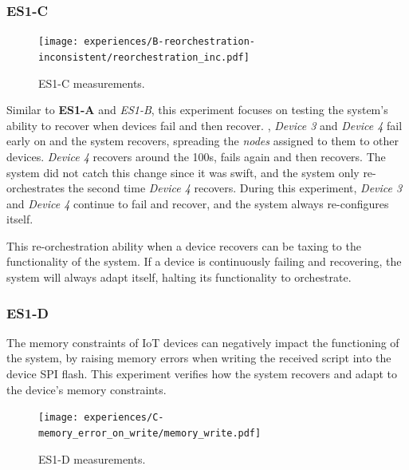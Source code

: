 
\subsubsection{ES1-C}

\begin{figure}[h]
    \centering
    \texttt{[image: experiences/B-reorchestration-inconsistent/reorchestration\_inc.pdf]}
    \caption[ES1-C measurements]{ES1-C measurements.}
    \label{fig:experiment_b_graph}
\end{figure}

Similar to \textbf{ES1-A} and \textit{ES1-B}, this experiment focuses on testing the system's ability to recover when devices fail and then recover. , \textit{Device 3} and \textit{Device 4} fail early on and the system recovers, spreading the \textit{nodes} assigned to them to other devices. \textit{Device 4} recovers around the 100s, fails again and then recovers. The system did not catch this change since it was swift, and the system only re-orchestrates the second time \textit{Device 4} recovers. During this experiment, \textit{Device 3} and \textit{Device 4} continue to fail and recover, and the system always re-configures itself.

This re-orchestration ability when a device recovers can be taxing to the functionality of the system. If a device is continuously failing and recovering, the system will always adapt itself, halting its functionality to orchestrate.


\subsubsection{ES1-D}

The memory constraints of IoT devices can negatively impact the functioning of the system, by raising memory errors when writing the received script into the device SPI flash. This experiment verifies how the system recovers and adapt to the device's memory constraints.

\begin{figure}[h]
\centering
\texttt{[image: experiences/C-memory\_error\_on\_write/memory\_write.pdf]}
\caption[ES1-D measurements]{ES1-D measurements.}\label{fig:experiment_c_graph}
\end{figure}

